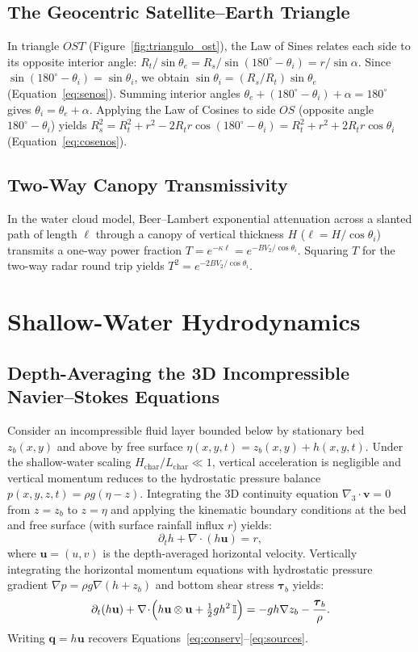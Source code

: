 \documentclass[11pt,a4paper]{article}
\begin{document}
\subsection{The Geocentric Satellite--Earth Triangle}

In triangle $OST$ (Figure~\ref{fig:triangulo_ost}), the Law of Sines relates each side to its opposite interior angle: $R_t/\sin\theta_e=R_s/\sin(180^\circ-\theta_i)=r/\sin\alpha$. Since $\sin(180^\circ-\theta_i)=\sin\theta_i$, we obtain $\sin\theta_i=(R_s/R_t)\sin\theta_e$ (Equation~\eqref{eq:senos}). Summing interior angles $\theta_e+(180^\circ-\theta_i)+\alpha=180^\circ$ gives $\theta_i=\theta_e+\alpha$. Applying the Law of Cosines to side $OS$ (opposite angle $180^\circ-\theta_i$) yields $R_s^2=R_t^2+r^2-2R_tr\cos(180^\circ-\theta_i)=R_t^2+r^2+2R_tr\cos\theta_i$ (Equation~\eqref{eq:cosenos}).

\subsection{Two-Way Canopy Transmissivity}

In the water cloud model, Beer--Lambert exponential attenuation across a slanted path of length $\ell$ through a canopy of vertical thickness $H$ ($\ell=H/\cos\theta_i$) transmits a one-way power fraction $T = e^{-\kappa\ell} = e^{-BV_2/\cos\theta_i}$. Squaring $T$ for the two-way radar round trip yields $T^2=e^{-2BV_2/\cos\theta_i}$.

\section{Shallow-Water Hydrodynamics}
\label{sec:der-swe}

\subsection{Depth-Averaging the 3D Incompressible Navier--Stokes Equations}

Consider an incompressible fluid layer bounded below by stationary bed $z_b(x,y)$ and above by free surface $\eta(x,y,t)=z_b(x,y)+h(x,y,t)$. Under the shallow-water scaling $H_{\text{char}}/L_{\text{char}} \ll 1$, vertical acceleration is negligible and vertical momentum reduces to the hydrostatic pressure balance $p(x,y,z,t)=\rho g(\eta-z)$. Integrating the 3D continuity equation $\nabla_3\cdot\mathbf v = 0$ from $z=z_b$ to $z=\eta$ and applying the kinematic boundary conditions at the bed and free surface (with surface rainfall influx $r$) yields:
\[
  \partial_th+\nabla\!\cdot\!(h\mathbf u)=r,
\]
where $\mathbf u=(u,v)$ is the depth-averaged horizontal velocity. Vertically integrating the horizontal momentum equations with hydrostatic pressure gradient $\nabla p = \rho g\nabla(h+z_b)$ and bottom shear stress $\boldsymbol\tau_b$ yields:
\[
  \partial_t(h\mathbf u)+\nabla\!\cdot\!\Bigl(h\mathbf u\otimes\mathbf u+\tfrac12gh^2\,\mathbb{I}\Bigr)
  =-gh\nabla z_b-\frac{\boldsymbol\tau_b}{\rho}.
\]
Writing $\mathbf q=h\mathbf u$ recovers Equations~\eqref{eq:conserv}--\eqref{eq:sources}.
\end{document}
